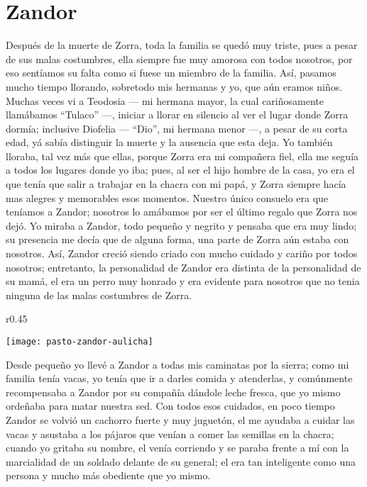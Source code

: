 \cleardoublepage
\newpage
\ifdefined\EnableIncludeImages
\fi
\chapter{Zandor}
Después de la muerte de Zorra, toda la familia se quedó muy triste, pues a pesar de sus malas costumbres, ella siempre fue muy amorosa con todos nosotros, por eso sentíamos su falta como si fuese un miembro de la familia.
Así, pasamos mucho tiempo llorando, sobretodo mis hermanas y yo, que aún eramos niños.
Muchas veces vi a Teodosia --- mi hermana mayor, la cual cariñosamente llamábamos ``Tulaco'' ---, iniciar a llorar en silencio al ver el lugar donde Zorra dormía; inclusive Diofelia --- ``Dio'', mi hermana menor ---, a pesar de su corta edad, yá sabía distinguir la muerte y la ausencia que esta deja.
Yo también lloraba, tal vez más que ellas, porque Zorra era mi compañera fiel, ella me seguía a todos los lugares donde yo iba; pues, al ser el hijo hombre de la casa, yo era el que tenía que salir a trabajar en la chacra con mi papá, y Zorra siempre hacía mas alegres y memorables esos momentos.
Nuestro único consuelo era que teníamos a Zandor; nosotros lo amábamos por ser el último regalo que Zorra nos dejó.
Yo miraba a Zandor, todo pequeño y negrito y pensaba que era muy lindo; su presencia me decía que de alguna forma, una parte de Zorra aún estaba con nosotros.
Así, Zandor creció siendo criado con mucho cuidado y cariño por todos nosotros;
entretanto, la personalidad de Zandor era distinta de la personalidad de su mamá, el era un perro muy honrado y era evidente para nosotros que no tenia ninguna de las malas costumbres de Zorra.
\ifdefined\EnableIncludeImages
\begin{wrapfigure}{r}{0.45\textwidth}
  \begin{center}
  \vspace{-20pt}
    \texttt{[image: pasto-zandor-aulicha]}
  \end{center}
  \vspace{-20pt}
\end{wrapfigure}
\fi
Desde pequeño yo llevé a Zandor a todas mis caminatas por la sierra; como mi familia tenía vacas, yo tenía que ir a darles comida y atenderlas, y comúnmente recompensaba a Zandor por su compañía dándole leche fresca, que yo mismo ordeñaba para matar nuestra sed.
Con todos esos cuidados, en poco tiempo Zandor se volvió un cachorro fuerte y muy juguetón,
el me ayudaba a cuidar las vacas y asustaba a los pájaros que venían a comer las semillas en la chacra; cuando yo gritaba su nombre, el venía corriendo y se paraba frente a mí con la marcialidad de un soldado delante de su general; el era tan inteligente como una persona y mucho más obediente que yo mismo.

